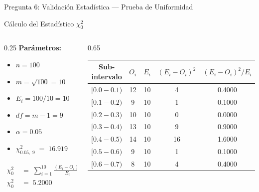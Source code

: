 \documentclass[aspectratio=169, 10pt]{beamer}
\begin{document}
\begin{frame}{Pregunta 6: Validación Estadística — Prueba de Uniformidad}
	\begin{exampleblock}{Cálculo del Estadístico $\chi_0^2$}
		\begin{columns}[T]
			\begin{column}{0.25\textwidth}
				\textbf{Parámetros:}
				\begin{itemize}
					\item $n = 100$
					\item $m = \sqrt{100} = 10$
					\item $E_i = 100/10 = 10$
					\item $df = m - 1 = 9$
					\item $\alpha = 0.05$
					\item $\chi^2_{0.05,\;9} \;=\; 16.919$
				\end{itemize}
				\begin{align*}
					\chi^2_0 & \;=\; \sum_{i=1}^{10}\frac{(E_i - O_i)^2}{E_i} \\[6pt]
					\chi^2_0 & \;=\; \mathbf{5.2000}
				\end{align*}
			\end{column}
			\begin{column}{0.65\textwidth}
				\begin{center}
					\vspace{-12pt}
					\small
					\renewcommand{\arraystretch}{1.2}
					\begin{tabular}{ccccc}
						\toprule
						\textbf{Sub-intervalo} & $O_i$        & $E_i$        & $(E_i - O_i)^2$ & $(E_i-O_i)^2/E_i$ \\
						\midrule
						$[0.0 - 0.1)$          & 12           & 10           & 4               & 0.4000            \\
						$[0.1 - 0.2)$          & 9            & 10           & 1               & 0.1000            \\
						$[0.2 - 0.3)$          & 10           & 10           & 0               & 0.0000            \\
						$[0.3 - 0.4)$          & 13           & 10           & 9               & 0.9000            \\
						$[0.4 - 0.5)$          & 14           & 10           & 16              & 1.6000            \\
						$[0.5 - 0.6)$          & 9            & 10           & 1               & 0.1000            \\
						$[0.6 - 0.7)$          & 8            & 10           & 4               & 0.4000            \\

\end{tabular}
\end{center}
\end{column}
\end{columns}
\end{exampleblock}
\end{frame}
\end{document}
